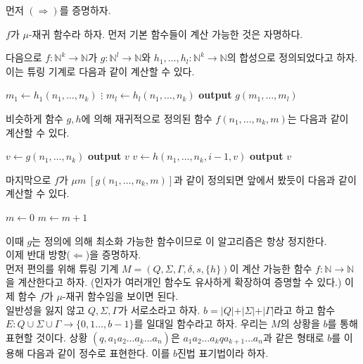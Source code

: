 \documentclass[b5paper, 11pt]{book}
\theoremstyle{definition}
\newenvironment{pf*}{\pushQED{\qed}\pf}
{\popQED\endpf}
\begin{document}
\begin{pf*}
    먼저 $(\Rightarrow)$를 증명하자. 

    $f$가 $\mu$-재귀 함수라 하자. 먼저 기본 함수들이 계산 가능한 것은 자명하다. 

    다음으로 $f:\mathbb{N}^k \rightarrow \mathbb{N}$가 
    $g: \mathbb{N}^l \rightarrow \mathbb{N}$와 $h_1, \ldots, h_l:\mathbb{N}^k \rightarrow 
    \mathbb{N}$의 합성으로 정의되었다고 하자. 이는 튜링 기계로 다음과 같이 계산할 수 있다.
    \begin{algorithmic}
        \State $m_1 \gets h_1(n_1, \ldots, n_k)$
        \State $\vdots$
        \State $m_l \gets h_l(n_1, \ldots, n_k)$
        \State \textbf{output} $g(m_1, \ldots, m_l)$
    \end{algorithmic}
    비슷하게 함수 $g, h$에 의해 재귀적으로 정의된 함수 $f(n_1, \ldots, n_k, m)$는 다음과 같이 계산할 수 있다.
    \begin{algorithmic}
        \State $v \gets g(n_1, \ldots, n_k)$
        \State \textbf{output} $v$
        \Else
        \State $v \gets h(n_1, \ldots, n_k, i-1, v)$
        \EndFor
        \State \textbf{output} $v$
        \EndIf
    \end{algorithmic}
    마지막으로 $f$가 $\mu m \; [g(n_1, \ldots, n_k, m)]$과 같이 정의되면 앞에서 봤듯이 
    다음과 같이 계산할 수 있다.
    \begin{algorithmic}
        \State $m \gets 0$
            \State $m \gets m+1$
        \EndWhile
    \end{algorithmic}
    이때 $g$는 정의에 의해 최소화 가능한 함수이므로 이 알고리즘은 항상 정지한다.\\
    이제 반대 방향($\Leftarrow$)을 증명하자.\\
    먼저 편의를 위해 튜링 기계 $M = (Q, \Sigma, \Gamma, \delta,
    s, \{h\})$이 계산 가능한 함수 $f: \mathbb{N} \rightarrow \mathbb{N}$을 
    계산한다고 하자. (인자가 여러개인 함수도 
    유사하게 확장하여 증명할 수 있다.) 이제 함수 $f$가 $\mu$-재귀 함수임을 보이면 된다. \\
    일반성을 잃지 않고 $Q, \Sigma, \Gamma$가 서로소라고 하자. $b = \vert Q \vert + \vert \Sigma \vert 
    + \vert \Gamma \vert$라고 하고 함수 $E:Q \cup \Sigma \cup \Gamma \rightarrow \{0, 1 
    \ldots, b-1\}$를 일대일 함수라고 하자. 우리는 $M$의 상황을 $b$를 통해 표현할 것이다. 상황 $(q,
    a_1a_2 \ldots \underline{a_k} \ldots a_n)$은 $a_1a_2\ldots a_k q a_{k+1} \ldots a_n$과 같은 형태로 
    $b$를 이용해 다음과 같이 정수로 표현한다. 이를 $b$진법 표기법이라 하자. 

\end{pf*}
\end{document}
